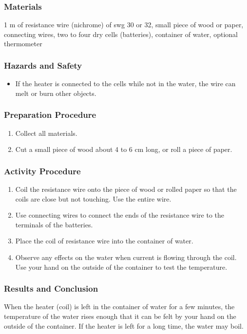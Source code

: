 \subsubsection*{Materials}
1 m of resistance wire (nichrome) of swg 30 or 32, small piece of wood or paper, connecting wires, two to four dry cells (batteries), container of water, optional thermometer

\subsubsection*{Hazards and Safety}
\begin{itemize}
\item{If the heater is connected to the cells while not in the water, the wire can melt or burn other objects.} 
\end{itemize}

\subsubsection*{Preparation Procedure}
\begin{enumerate}
\item{Collect all materials.} 
\item{Cut a small piece of wood about 4 to 6 cm long, or roll a piece of paper.} 
\end{enumerate}

\subsubsection*{Activity Procedure}
\begin{enumerate}
\item{Coil the resistance wire onto the piece of wood or rolled paper so that the coils are close but not touching. Use the entire wire.} 
\item{Use connecting wires to connect the ends of the resistance wire to the terminals of the batteries.} 
\item{Place the coil of resistance wire into the container of water.} 
\item{Observe any effects on the water when current is flowing through the coil. Use your hand on the outside of the container to test the temperature.} 
\end{enumerate}

\subsubsection*{Results and Conclusion}
When the heater (coil) is left in the container of water for a few minutes, the temperature of the water rises enough that it can be felt by your hand on the outside of the container. If the heater is left for a long time, the water may boil.  

